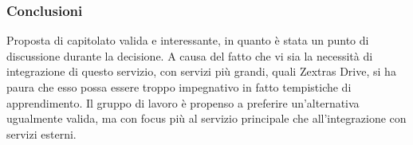 		\subsubsection{Conclusioni}
			Proposta di capitolato valida e interessante, in quanto è stata un punto di discussione durante la decisione. A causa del fatto che vi sia la necessità di integrazione di questo servizio, con servizi più grandi, quali Zextras Drive, si ha paura che esso possa essere troppo impegnativo in fatto tempistiche di apprendimento. Il gruppo di lavoro è propenso a preferire un’alternativa ugualmente valida, ma con focus più al servizio principale che all’integrazione con servizi esterni.
\newpage
				
				
		
				
				
				
				
				
				
				
				
				
				
				
				
				
				
				
				
				